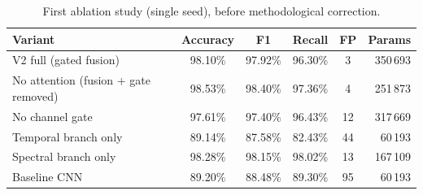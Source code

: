\begin{table}[H]
\centering
\caption{First ablation study (single seed), before methodological correction.}
\renewcommand{\arraystretch}{1.25}
\small
\begin{tabular}{|l|c|c|c|c|r|}
\hline
\textbf{Variant} & \textbf{Accuracy} & \textbf{F1} & \textbf{Recall} & \textbf{FP} & \textbf{Params} \\
\hline
V2 full (gated fusion) & 98.10\% & 97.92\% & 96.30\% & 3 & 350\,693 \\
\hline
No attention (fusion + gate removed) & 98.53\% & 98.40\% & 97.36\% & 4 & 251\,873 \\
\hline
No channel gate & 97.61\% & 97.40\% & 96.43\% & 12 & 317\,669 \\
\hline
Temporal branch only & 89.14\% & 87.58\% & 82.43\% & 44 & 60\,193 \\
\hline
Spectral branch only & 98.28\% & 98.15\% & 98.02\% & 13 & 167\,109 \\
\hline
Baseline CNN & 89.20\% & 88.48\% & 89.30\% & 95 & 60\,193 \\
\hline
\end{tabular}
\end{table}
